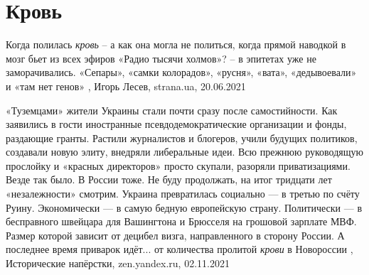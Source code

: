  
 
 
 
 
\chapter{Кровь}
\label{sec:slova.krovj}

Когда полилась \emph{кровь} – а как она могла не политься, когда прямой
наводкой в мозг бьет из всех эфиров «Радио тысячи холмов»? – в эпитетах уже не
заморачивались. «Сепары», «самки колорадов», «русня», «вата», «дедывоевали» и
«там нет генов»
, 
Игорь Лесев, strana.ua, 20.06.2021

«Туземцами» жители Украины стали почти сразу после самостийности. Как заявились
в гости иностранные псевдодемократические организации и фонды, раздающие
гранты. Растили журналистов и блогеров, учили будущих политиков, создавали
новую элиту, внедряли либеральные идеи. Всю прежнюю руководящую прослойку и
«красных директоров» просто скупали, разоряли приватизациями. Везде так было. В
России тоже.  Не буду продолжать, на итог тридцати лет «незалежности» смотрим.
Украина превратилась социально — в третью по счёту Руину. Экономически — в
самую бедную европейскую страну. Политически — в бесправного швейцара для
Вашингтона и Брюсселя на грошовой зарплате МВФ. Размер которой зависит от
децибел визга, направленного в сторону России. А последнее время приварок
идёт... от количества пролитой \emph{крови} в Новороссии
, 
Исторические напёрстки, zen.yandex.ru, 02.11.2021
